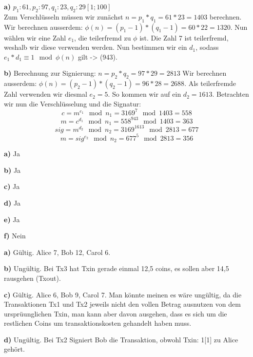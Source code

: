 \documentclass[german]{../uebung}
\begin{document}
\begin{exercise}{2}

    \textbf{a)}
    \(p_1: 61, p_2: 97, q_1: 23, q_2: 29 [1; 100]\)\\
    Zum Verschlüsseln müssen wir zunächst \(n=p_1*q_1=61*23=1403\) berechnen.
    Wir berechnen ausserdem: \(\phi(n)=(p_1-1)*(q_1-1)=60*22=1320\).
    Nun wählen wir eine Zahl \(e_1\), die teilerfremd zu \(\phi\) ist. Die Zahl 7 ist teilerfremd, weshalb wir diese verwenden werden.
    Nun bestimmen wir ein \(d_1\), sodass \(e_1*d_1 \equiv 1 \mod \phi(n) \) gilt -> (943).

    \textbf{b)}
    Berechnung zur Signierung: \(n=p_2*q_2=97*29=2813\)
    Wir berechnen ausserdem: \(\phi(n)=(p_2-1)*(q_2-1)=96*28=2688\). Als teilerfremde Zahl verwenden wir diesmal \(e_2=5\). So kommen wir auf ein \(d_2=1613\). Betrachten wir nun die Verschlüsselung und die Signatur:
    \[c=m^{e_1} \mod n_1=3169^7 \mod 1403= 558\]
    \[m=c^{d_1} \mod n_1=558^{943} \mod 1403= 363\]
    \[sig=m^{d_2} \mod n_2=3169^{1613} \mod 2813= 677\]
    \[m=sig^{e_2} \mod n_2=677^5 \mod 2813= 356\]

\end{exercise}

\begin{exercise}{3}

    \textbf{a)}
    Ja

    \textbf{b)}
    Ja

    \textbf{c)}
    Ja

    \textbf{d)}
    Ja

    \textbf{e)}
    Ja

    \textbf{f)}
    Nein
\end{exercise}

\begin{exercise}{4}

    \textbf{a)}
    Gültig. Alice 7, Bob 12, Carol 6.

    \textbf{b)}
    Ungültig. Bei Tx3 hat Txin gerade einmal 12,5 coins, es sollen aber 14,5 rausgehen (Txout).

    \textbf{c)}
    Gültig. Alice 6, Bob 9, Carol 7. Man könnte meinen es wäre ungültig, da die Transaktionen Tx1 und Tx2 jeweils nicht den vollen Betrag ausnutzen von dem ursprüunglichen Txin, man kann aber davon ausgehen, dass es sich um die restlichen Coins um transaktionskosten gehandelt haben muss.

    \textbf{d)}
    Ungültig. Bei Tx2 Signiert Bob die Transaktion, obwohl Txin: 1[1] zu Alice gehört.
\end{exercise}
\end{document}
